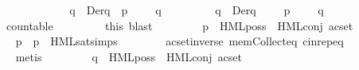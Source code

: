 \begin{isabellebody}
\ \ \ \ \isamarkupfalse%
\ {\isasymPhi}\ \ {\isacharasterisk}{\kern0pt}{\isacharcolon}{\kern0pt}\isanewline
\ \ \ \ \ \ {\isacartoucheopen}{\isasymforall}{\isasymphi}\ {\isasymin}\ {\isasymPhi}{\isachardot}{\kern0pt}\ {\isasymexists}q{\isacharprime}{\kern0pt}\ {\isasymin}\ Der{\isacharparenleft}{\kern0pt}q{\isacharcomma}{\kern0pt}\ {\isasymalpha}{\isacharparenright}{\kern0pt}{\isachardot}{\kern0pt}\ p{\isacharprime}{\kern0pt}\ {\isasymTurnstile}\ {\isasymphi}\ {\isasymand}\ {\isasymnot}\ q{\isacharprime}{\kern0pt}\ {\isasymTurnstile}\ {\isasymphi}{\isacartoucheclose}\ \isanewline
\ \ \ \ \ \ {\isacartoucheopen}{\isasymforall}q{\isacharprime}{\kern0pt}\ {\isasymin}\ Der{\isacharparenleft}{\kern0pt}q{\isacharcomma}{\kern0pt}\ {\isasymalpha}{\isacharparenright}{\kern0pt}{\isachardot}{\kern0pt}\ {\isasymexists}{\isasymphi}\ {\isasymin}\ {\isasymPhi}{\isachardot}{\kern0pt}\ p{\isacharprime}{\kern0pt}\ {\isasymTurnstile}\ {\isasymphi}\ {\isasymand}\ {\isasymnot}\ q{\isacharprime}{\kern0pt}\ {\isasymTurnstile}\ {\isasymphi}{\isacartoucheclose}\ \isanewline
\ \ \ \ \ \ {\isacartoucheopen}countable\ {\isasymPhi}{\isacartoucheclose}\isanewline
\ \ \ \ \ \ \isamarkupfalse%
\ {\isacharparenleft}{\kern0pt}this{\isacharcomma}{\kern0pt}\ blast{\isacharplus}{\kern0pt}{\isacharparenright}{\kern0pt}\isanewline
\ \ \isanewline
\ \ \ \ \isamarkupfalse%
\ {\isacartoucheopen}p\ {\isasymTurnstile}\ HML{\isacharunderscore}{\kern0pt}poss\ {\isasymalpha}\ {\isacharparenleft}{\kern0pt}HML{\isacharunderscore}{\kern0pt}conj\ {\isacharparenleft}{\kern0pt}acset\ {\isasymPhi}{\isacharparenright}{\kern0pt}{\isacharparenright}{\kern0pt}{\isacartoucheclose}\isanewline
\ \ \ \ \ \ \isamarkupfalse%
\ {\isacartoucheopen}p\ {\isasymlongmapsto}{\isasymalpha}\ p{\isacharprime}{\kern0pt}{\isacartoucheclose}\ {\isacharasterisk}{\kern0pt}{\isacharparenleft}{\kern0pt}{}{\isacharcomma}{\kern0pt}{}{\isacharparenright}{\kern0pt}\ HML{\isacharunderscore}{\kern0pt}sat{\isachardot}{\kern0pt}simps{\isacharparenleft}{\kern0pt}{}{\isacharcomma}{\kern0pt}{}{\isacharparenright}{\kern0pt}\isanewline
\ \ \ \ \ \ \ \ acset{\isacharunderscore}{\kern0pt}inverse\ mem{\isacharunderscore}{\kern0pt}Collect{\isacharunderscore}{\kern0pt}eq\ cin{\isachardot}{\kern0pt}rep{\isacharunderscore}{\kern0pt}eq\isanewline
\ \ \ \ \ \ \isamarkupfalse%
\ metis\isanewline
\isanewline
\ \ \ \ \isamarkupfalse%
\ \isamarkupfalse%
\ {\isacartoucheopen}{\isasymnot}\ q\ {\isasymTurnstile}\ HML{\isacharunderscore}{\kern0pt}poss\ {\isasymalpha}\ {\isacharparenleft}{\kern0pt}HML{\isacharunderscore}{\kern0pt}conj\ {\isacharparenleft}{\kern0pt}acset\ {\isasymPhi}{\isacharparenright}{\kern0pt}{\isacharparenright}{\kern0pt}{\isacartoucheclose}\isanewline

\end{isabellebody}
